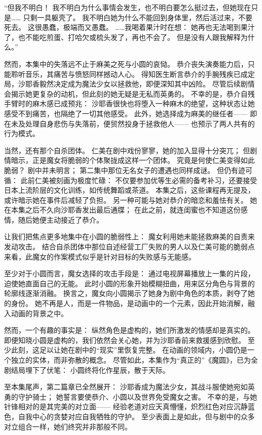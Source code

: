 “但我不明白！
我不明白为什么事情会发生，也不明白要怎么挺过去，但她现在只是……
只剩一具躯壳了。
我不明白她为什么不能回到身体里，然后活过来，不要死去。
这很愚蠢，极端而又愚蠢。
……我喝着果汁时在想：
她再也无法喝到果汁了，也不能吃煎蛋、打哈欠或梳头发了，再也不会了。
但是没有人跟我解释为什么。”
\cite{ref31}

然而，本集中的失落远不止于麻美之死与小圆的哀恸。
恭介丧失演奏能力后，只能聆听音乐，其痛苦与愤怒同样撼动人心。
得知医生断言恭介的手腕残疾已成定局，沙耶香毅然决定成为魔法少女以拯救他，即便深知其中凶险。
尽管后续剧情会揭示她更复杂的动机，但此刻的她无疑是无私而英勇的。
不幸的是，恭介自残手臂时的麻木感已成预兆：
沙耶香很快也将堕入一种麻木的绝望，这种状态让她感受不到痛苦，也隔绝了一切其他感受。
此外，她选择成为麻美的继任者——
即在未及处理自身悲伤与失落前，便贸然投身于拯救他人——
也预示了两人共有的行为模式。

当然，还有那个自杀团体。
仁美在剧中戏份寥寥，她的加入显得十分突兀；
但剧情暗示，正是魔女将脆弱的个体聚拢成这样一个团体。
究竟是何使仁美变得如此脆弱？
剧中并未明言；
第二集中那位无名女子的遭遇也同样成谜。
但仍有迹可循：
此前仁美被刻画为极度忙碌：
不仅要参加优等生必需的备考补习，还要接受日本上流阶层的文化训练，如传统舞蹈或茶道。
本集之后，这些课程再无提及，或许暗示她在事件后减轻了负担。
另一种可能与她对恭介的暗恋和羞怯有关。
她在本集之后不久向沙耶香发出最后通牒；
在此之前，就连闺蜜也不知道这份感情，随后她便主动接近了恭介。

让我们把焦点更多地集中在小圆的脆弱性上：
魔女利用她未能拯救麻美的自责来发动攻击。
结合自杀团体中那位自述经营工厂失败的男人以及仁美可能的脆弱点来看，此魔女的作案模式似乎是针对目标的失败感与无能感。

至少对于小圆而言，魔女选择的攻击手段是：
通过电视屏幕播放上一集的片段，迫使她直面自己的无能。
此时小圆的形象开始模糊扭曲，用来区分角色与背景的轮廓线逐渐消融。
换言之，魔女向小圆揭示了她身为剧中角色的本质，剥夺了她的身份。
她不再是人，而是一件物品，是动画中的一个元素，因此开始消解，融入动画的背景之中。

然而，一个有趣的事实是：
纵然角色是虚构的，她们所激发的情感却是真实的。
即便知晓小圆是虚构的，我们依然会关心她，并为沙耶香前来救援感到欣慰。
至少此刻，这足以让她在剧中的“现实”里恢复完整。
在动画的领域内，小圆仍是一个独立的实体，而非弥散的概念。
尽管如此，本集作为“真正的”《魔圆》，已为全剧结局埋下了伏笔：
小圆终将化作星辰，散于天际。

至本集尾声，第二篇章已全然展开：
沙耶香成为魔法少女，其战斗服使她宛如英勇的守护骑士；
她誓言要使恭介、小圆以及世界免受魔女之害。
不幸的是，与她针锋相对的是其完美的对立面——
经验老道对应天真懵懂，炽烈红色对应沉静蓝色，自我中心的贪婪对应自我牺牲的守护。
至少表面上是如此，但与剧中的众多对立组合一样，她们终究并非那般不同。
